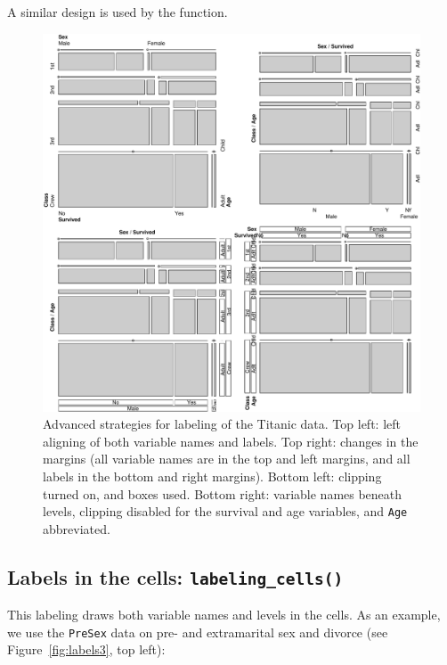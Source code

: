 \documentclass{Z}
\newcommand{\data}[1]{\texttt{#1}}
\newcommand{\codefun}[1]{\code{#1()}}
\begin{document}
\noindent A similar design is used by the \codefun{doubledecker} function.

\begin{figure}[p]
\begin{center}
\includegraphics{strucplot-label2fig}
\caption{Advanced strategies for labeling of the Titanic data. Top
  left: left aligning of both variable names and labels. 
  Top right: changes in the margins (all variable names are in the top
  and left margins, and all labels in the bottom and right margins). 
  Bottom left: clipping turned on, and boxes used. Bottom right: 
  variable names beneath levels, clipping disabled for the
  survival and age variables, and \texttt{Age} abbreviated.}
\label{fig:labels2}
\end{center}
\end{figure}

\subsection[Labels in the cells]{Labels in the cells: \texttt{labeling\_cells()}}

This labeling draws both variable names and levels in the
cells. As an example, we use the \data{PreSex} data on pre- and
extramarital sex and divorce (see Figure~\ref{fig:labels3}, top left):
\end{document}
